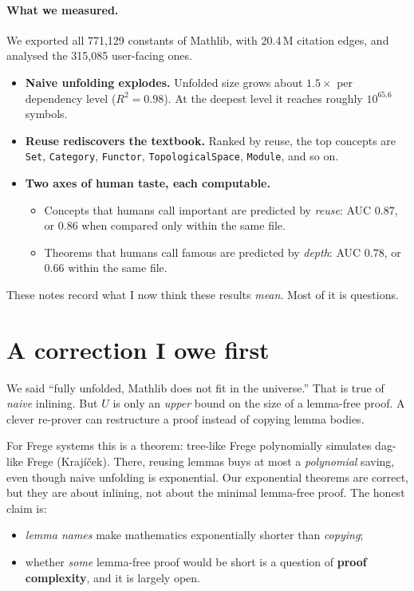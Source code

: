 \documentclass[11pt]{article}
\begin{document}
\paragraph{What we measured.} We exported all 771{,}129 constants of Mathlib, with
20.4\,M citation edges, and analysed the 315{,}085 user-facing ones.
\begin{itemize}
\item \textbf{Naive unfolding explodes.} Unfolded size grows about $1.5\times$ per
  dependency level ($R^2=0.98$). At the deepest level it reaches roughly $10^{65.6}$ symbols.
\item \textbf{Reuse rediscovers the textbook.} Ranked by reuse, the top concepts are
  \texttt{Set}, \texttt{Category}, \texttt{Functor}, \texttt{TopologicalSpace},
  \texttt{Module}, and so on.
\item \textbf{Two axes of human taste, each computable.}
  \begin{itemize}
  \item Concepts that humans call important are predicted by \emph{reuse}: AUC $0.87$, or
    $0.86$ when compared only within the same file.
  \item Theorems that humans call famous are predicted by \emph{depth}: AUC $0.78$, or $0.66$
    within the same file.
  \end{itemize}
\end{itemize}

\noindent These notes record what I now think these results \emph{mean}. Most of it is
questions.

\section{A correction I owe first}

We said ``fully unfolded, Mathlib does not fit in the universe.'' That is true of
\emph{naive} inlining. But $U$ is only an \emph{upper} bound on the size of a lemma-free
proof. A clever re-prover can restructure a proof instead of copying lemma bodies.

For Frege systems this is a theorem: tree-like Frege polynomially simulates dag-like Frege
(Kraj\'i\v{c}ek). There, reusing lemmas buys at most a \emph{polynomial} saving, even though
naive unfolding is exponential. Our exponential theorems are correct, but they are about
inlining, not about the minimal lemma-free proof. The honest claim is:
\begin{itemize}
\item \emph{lemma names} make mathematics exponentially shorter than \emph{copying};
\item whether \emph{some} lemma-free proof would be short is a question of
  \textbf{proof complexity}, and it is largely open.
\end{itemize}
\end{document}
